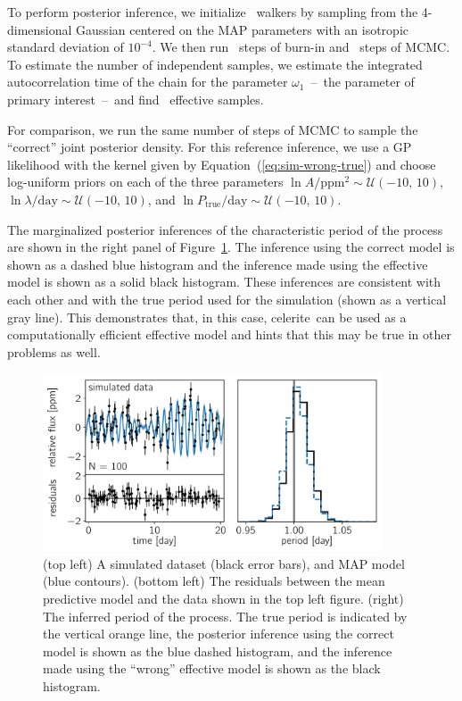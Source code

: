\documentclass[manuscript, letterpaper]{aastex6}
\newcommand{\project}[1]{\textsf{#1}}
\newcommand{\celerite}{\project{celerite}}
\newcommand{\figureref}[1]{\ref{fig:#1}}
\newcommand{\Figure}[1]{Figure~\figureref{#1}}
\newcommand{\figurelabel}[1]{\label{fig:#1}}
\renewcommand{\eqref}[1]{\ref{eq:#1}}
\newcommand{\Eq}[1]{Equation~(\eqref{#1})}
\newcommand{\eq}[1]{\Eq{#1}}
\begin{document}
{To perform posterior inference, we initialize \exampleiinwalkers~walkers by
sampling from the 4-dimensional Gaussian centered on the MAP parameters with
an isotropic standard deviation of $10^{-4}$.
We then run \exampleiinburn~steps of burn-in and \exampleiinsteps~steps of
MCMC.
To estimate the number of independent samples, we estimate the integrated
autocorrelation time of the chain for the parameter $\omega_1$~--~the
parameter of primary interest~--~and find \exampleiineff~effective samples.

For comparison, we run the same number of steps of MCMC to sample the
``correct'' joint posterior density.
For this reference inference, we use a GP likelihood with the kernel given by
\eq{sim-wrong-true} and choose log-uniform priors on each of the
three parameters $\ln A/\mathrm{ppm}^2 \sim \mathcal{U}(-10,\,10)$,
$\ln \lambda/\mathrm{day} \sim \mathcal{U}(-10,\,10)$, and
$\ln P_\mathrm{true}/\mathrm{day} \sim \mathcal{U}(-10,\,10)$.

The marginalized posterior inferences of the characteristic period of the
process are shown in the right panel of \Figure{simulated-wrong}.
The inference using the correct model is shown as a dashed blue histogram and
the inference made using the effective model is shown as a solid black
histogram.
These inferences are consistent with each other and with the true period used
for the simulation (shown as a vertical gray line).
This demonstrates that, in this case, \celerite\ can be used as a
computationally efficient effective model and hints that this may be true in
other problems as well.
}



\begin{figure}[!htbp]
\begin{center}
\includegraphics[width=0.9\textwidth]{figures/simulated/wrong-qpo.pdf}
\caption{(top left) A simulated dataset (black error bars), and MAP
    model (blue contours).
    (bottom left) The residuals between the mean predictive model and the data
    shown in the top left figure.
    (right) The inferred period of the process. The true period is indicated
    by the vertical orange line, the posterior inference using the correct
    model is shown as the blue dashed histogram, and the inference made using
    the ``wrong'' effective model is shown as the black histogram.
    \figurelabel{simulated-wrong}}
\end{center}
\end{figure}
\end{document}
